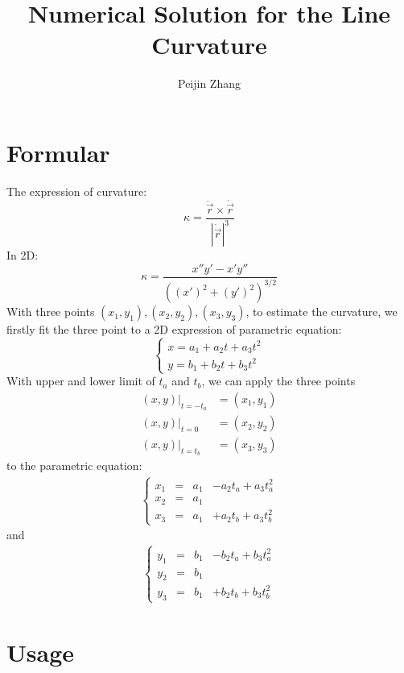 \documentclass{article}
\title{Numerical Solution for the Line Curvature}
\author{Peijin Zhang}
\begin{document}
	\maketitle
	\section{Formular}
	The expression of curvature:
	\begin{equation}
	\kappa = \frac{\ddot{\vec{r}}\times\dot{\vec{r}}}{\left| \dot{\vec{r}}\right|^3}
	\end{equation}
	In 2D:
	\begin{equation}
	\kappa = \frac{x''y'-x'y''}{\left( (x')^2+(y')^2\right)^{3/2}}
	\end{equation}
	With three points $(x_1,y_1), (x_2,y_2), (x_3,y_3)$, to estimate the curvature, we firstly fit the three point to a 2D expression of parametric equation:
	\begin{equation}
	\left\{ \begin{matrix} x = a_1 +a_2 t+a_3 t^2\\ y= b_1 +b_2 t+b_3 t^2 \end{matrix} \right.
	\end{equation}
	With upper and lower limit of $t_a$ and $t_b$, we can apply the three points
	\begin{align}
	(x,y)|_{t=-t_a} &= (x_1,y_1)\\ (x,y)|_{t=0} &= (x_2,y_2)\\ (x,y)|_{t=t_b} &= (x_3,y_3)
	\end{align}
	 to the parametric equation:
	 \begin{align}
	 \left\{ \begin{matrix} x_1 &= & a_1 &- a_2 t_a +a_3 t_a^2\\ x_2 &= &a_1 &\\ x_3 &= &a_1 &+ a_2 t_b + a_3 t_b^2 \end{matrix} \right.
	 \end{align}
	 and
	 \begin{align}
	 \left\{ \begin{matrix} y_1 &= & b_1 &- b_2 t_a + b_3 t_a^2\\ y_2 &= &b_1 &\\ y_3 &= &b_1 &+ b_2 t_b + b_3 t_b^2 \end{matrix} \right.
	 \end{align}

	
	\section{Usage}
\end{document}
